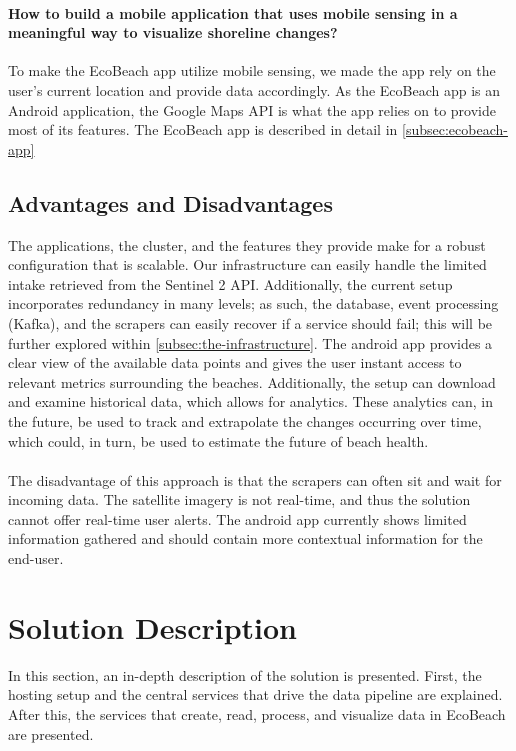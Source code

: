 \paragraph{How to build a mobile application that uses mobile sensing in a meaningful way to visualize shoreline changes?} To make the EcoBeach app utilize mobile sensing, we made the app rely on the user's current location and provide data accordingly. As the EcoBeach app is an Android application, the Google Maps API is what the app relies on to provide most of its features. The EcoBeach app is described in detail in \autoref{subsec:ecobeach-app}

\subsection{Advantages and Disadvantages}

The applications, the cluster, and the features they provide make for a robust configuration that is scalable. Our infrastructure can easily handle the limited intake retrieved from the Sentinel 2 API. Additionally, the current setup incorporates redundancy in many levels; as such, the database, event processing (Kafka), and the scrapers can easily recover if a service should fail; this will be further explored within \autoref{subsec:the-infrastructure}. The android app provides a clear view of the available data points and gives the user instant access to relevant metrics surrounding the beaches. Additionally, the setup can download and examine historical data, which allows for analytics. These analytics can, in the future, be used to track and extrapolate the changes occurring over time, which could, in turn, be used to estimate the future of beach health.\\\\

\noindent The disadvantage of this approach is that the scrapers can often sit and wait for incoming data. The satellite imagery is not real-time, and thus the solution cannot offer real-time user alerts. The android app currently shows limited information gathered and should contain more contextual information for the end-user. 

\section{Solution Description}

In this section, an in-depth description of the solution is presented. First, the hosting setup and the central services that drive the data pipeline are explained. After this, the services that create, read, process, and visualize data in EcoBeach are presented.

